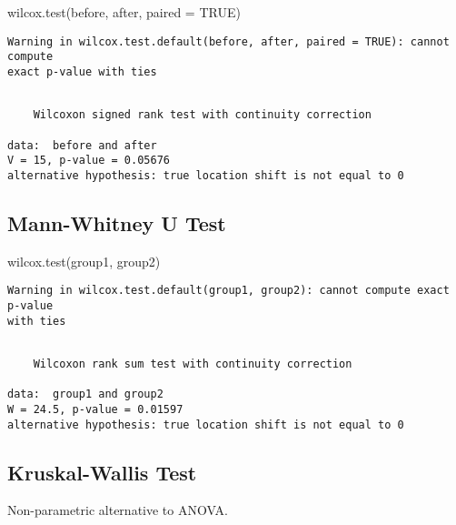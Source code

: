 \documentclass[
  letterpaper,
  DIV=11,
  numbers=noendperiod]{scrreprt}
\newenvironment{Shaded}{\begin{snugshade}}{\end{snugshade}}
\newcommand{\AttributeTok}[1]{\textcolor[rgb]{0.40,0.45,0.13}{#1}}
\newcommand{\ConstantTok}[1]{\textcolor[rgb]{0.56,0.35,0.01}{#1}}
\newcommand{\FunctionTok}[1]{\textcolor[rgb]{0.28,0.35,0.67}{#1}}
\newcommand{\NormalTok}[1]{\textcolor[rgb]{0.00,0.23,0.31}{#1}}
\begin{document}
\begin{Shaded}
\begin{Highlighting}[]
\FunctionTok{wilcox.test}\NormalTok{(before, after, }\AttributeTok{paired =} \ConstantTok{TRUE}\NormalTok{)}
\end{Highlighting}
\end{Shaded}

\begin{verbatim}
Warning in wilcox.test.default(before, after, paired = TRUE): cannot compute
exact p-value with ties
\end{verbatim}

\begin{verbatim}

    Wilcoxon signed rank test with continuity correction

data:  before and after
V = 15, p-value = 0.05676
alternative hypothesis: true location shift is not equal to 0
\end{verbatim}

\subsection{Mann-Whitney U Test}\label{mann-whitney-u-test}

\begin{Shaded}
\begin{Highlighting}[]
\FunctionTok{wilcox.test}\NormalTok{(group1, group2)}
\end{Highlighting}
\end{Shaded}

\begin{verbatim}
Warning in wilcox.test.default(group1, group2): cannot compute exact p-value
with ties
\end{verbatim}

\begin{verbatim}

    Wilcoxon rank sum test with continuity correction

data:  group1 and group2
W = 24.5, p-value = 0.01597
alternative hypothesis: true location shift is not equal to 0
\end{verbatim}

\subsection{Kruskal-Wallis Test}\label{kruskal-wallis-test}

Non-parametric alternative to ANOVA.
\end{document}

